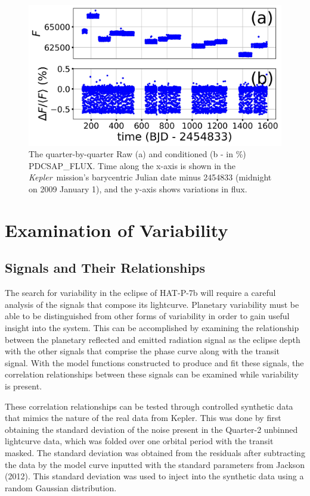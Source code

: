 \documentclass[manuscript]{aastex}
\newcommand{\kepler}{{\it Kepler}}
\begin{document}
\begin{figure}
\includegraphics[width=\textwidth]{Analysis_of_Kepler76b_data.jpg}
\caption{The quarter-by-quarter Raw (a) and conditioned (b - in \%) PDCSAP\_FLUX. Time along the x-axis is shown in the \kepler\ mission's barycentric Julian date minus 2454833 (midnight on 2009 January 1), and the y-axis shows variations in flux. \label{fig:Analysis_of_Kepler76b_data}}
\end{figure}

\section{Examination of Variability}

\subsection{Signals and Their Relationships}

	The search for variability in the eclipse of HAT-P-7b will require a careful analysis of the signals that compose its lightcurve. Planetary variability must be able to be distinguished from other forms of variability in order to gain useful insight into the system. This can be accomplished by examining the relationship between the planetary reflected and emitted radiation signal as the eclipse depth with the other signals that comprise the phase curve along with the transit signal. With the model functions constructed to produce and fit these signals, the correlation relationships between these signals can be examined while variability is present. 
    
	These correlation relationships can be tested through controlled synthetic data that mimics the nature of the real data from Kepler. This was done by first obtaining the standard deviation of the noise present in the Quarter-2 unbinned lightcurve data, which was folded over one orbital period with the transit masked. The standard deviation was obtained from the residuals after subtracting the data by the model curve inputted with the standard parameters from Jackson (2012). This standard deviation was used to inject into the synthetic data using a random Gaussian distribution.
    
\end{document}

